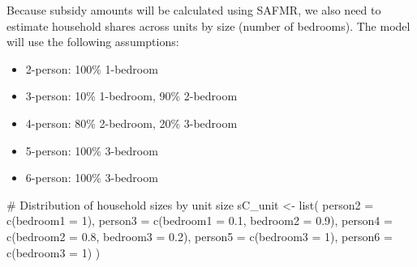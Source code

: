 \documentclass[
  10pt,
  letterpaper,
  DIV=11,
  numbers=noendperiod]{scrartcl}
\newenvironment{Shaded}{\begin{snugshade}}{\end{snugshade}}
\newcommand{\AttributeTok}[1]{\textcolor[rgb]{0.40,0.45,0.13}{#1}}
\newcommand{\CommentTok}[1]{\textcolor[rgb]{0.37,0.37,0.37}{#1}}
\newcommand{\DecValTok}[1]{\textcolor[rgb]{0.68,0.00,0.00}{#1}}
\newcommand{\FloatTok}[1]{\textcolor[rgb]{0.68,0.00,0.00}{#1}}
\newcommand{\FunctionTok}[1]{\textcolor[rgb]{0.28,0.35,0.67}{#1}}
\newcommand{\NormalTok}[1]{\textcolor[rgb]{0.00,0.23,0.31}{#1}}
\newcommand{\OtherTok}[1]{\textcolor[rgb]{0.00,0.23,0.31}{#1}}
\newcommand{\StringTok}[1]{\textcolor[rgb]{0.13,0.47,0.30}{#1}}
\providecommand{\tightlist}{%
  \setlength{\itemsep}{0pt}\setlength{\parskip}{0pt}}\usepackage{longtable,booktabs,array}
\begin{document}
Because subsidy amounts will be calculated using SAFMR, we also need to
estimate household shares across units by size (number of bedrooms). The
model will use the following assumptions:

\begin{itemize}
\tightlist
\item
  2-person: 100\% 1-bedroom
\item
  3-person: 10\% 1-bedroom, 90\% 2-bedroom
\item
  4-person: 80\% 2-bedroom, 20\% 3-bedroom
\item
  5-person: 100\% 3-bedroom
\item
  6-person: 100\% 3-bedroom
\end{itemize}

\begin{Shaded}
\begin{Highlighting}[]
\CommentTok{\# Distribution of household sizes by unit size}
\NormalTok{sC\_unit }\OtherTok{\textless{}{-}} \FunctionTok{list}\NormalTok{(}
    \StringTok{\textasciigrave{}}\AttributeTok{person2}\StringTok{\textasciigrave{}} \OtherTok{=} \FunctionTok{c}\NormalTok{(}\StringTok{\textasciigrave{}}\AttributeTok{bedroom1}\StringTok{\textasciigrave{}} \OtherTok{=} \DecValTok{1}\NormalTok{),}
    \StringTok{\textasciigrave{}}\AttributeTok{person3}\StringTok{\textasciigrave{}} \OtherTok{=} \FunctionTok{c}\NormalTok{(}\StringTok{\textasciigrave{}}\AttributeTok{bedroom1}\StringTok{\textasciigrave{}} \OtherTok{=} \FloatTok{0.1}\NormalTok{, }\StringTok{\textasciigrave{}}\AttributeTok{bedroom2}\StringTok{\textasciigrave{}} \OtherTok{=} \FloatTok{0.9}\NormalTok{),}
    \StringTok{\textasciigrave{}}\AttributeTok{person4}\StringTok{\textasciigrave{}} \OtherTok{=} \FunctionTok{c}\NormalTok{(}\StringTok{\textasciigrave{}}\AttributeTok{bedroom2}\StringTok{\textasciigrave{}} \OtherTok{=} \FloatTok{0.8}\NormalTok{, }\StringTok{\textasciigrave{}}\AttributeTok{bedroom3}\StringTok{\textasciigrave{}} \OtherTok{=} \FloatTok{0.2}\NormalTok{),}
    \StringTok{\textasciigrave{}}\AttributeTok{person5}\StringTok{\textasciigrave{}} \OtherTok{=} \FunctionTok{c}\NormalTok{(}\StringTok{\textasciigrave{}}\AttributeTok{bedroom3}\StringTok{\textasciigrave{}} \OtherTok{=} \DecValTok{1}\NormalTok{),}
    \StringTok{\textasciigrave{}}\AttributeTok{person6}\StringTok{\textasciigrave{}} \OtherTok{=} \FunctionTok{c}\NormalTok{(}\StringTok{\textasciigrave{}}\AttributeTok{bedroom3}\StringTok{\textasciigrave{}} \OtherTok{=} \DecValTok{1}\NormalTok{)}
\NormalTok{  )}
\end{Highlighting}
\end{Shaded}
\end{document}
